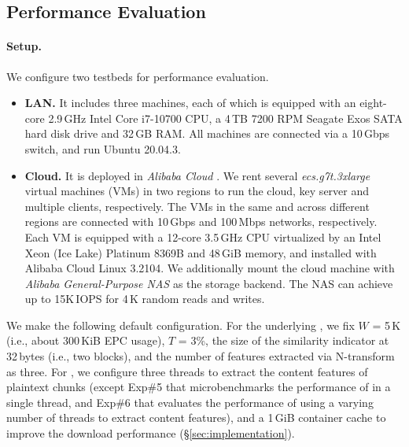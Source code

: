 \subsection{Performance Evaluation}
\label{sub:evaluation-performance}


\paragraph{Setup.} We configure two testbeds for performance evaluation. %
\begin{itemize}[leftmargin=*]
\item {\bf LAN.} It includes three machines, each of which is equipped with an eight-core 2.9\,GHz Intel Core i7-10700 CPU, a 4\,TB 7200 RPM Seagate Exos SATA hard disk drive and 32\,GB RAM.  All machines are connected via a 10\,Gbps switch, and run Ubuntu 20.04.3.

\item {\bf Cloud.} It is deployed in {\em Alibaba Cloud} \cite{alibaba}. We rent several {\em ecs.g7t.3xlarge} virtual machines (VMs) in two regions to run the cloud, key server and multiple clients, respectively. The VMs in the same and across different regions are connected with 10\,Gbps and 100\,Mbps networks, respectively.
  Each VM is equipped with a 12-core 3.5\,GHz CPU virtualized by an Intel Xeon (Ice Lake) Platinum 8369B and 48\,GiB memory, and installed with  Alibaba Cloud Linux 3.2104. We additionally mount the cloud machine with {\em Alibaba General-Purpose NAS} as the storage backend. The NAS can achieve up to 15K\,IOPS for 4\,K random reads and writes.
\end{itemize}

We make the following default configuration. For the underlying \sysnameF, we fix $W$ = 5\,K (i.e., about 300\,KiB EPC usage), $T$ = 3\%, the size of the similarity indicator at 32\,bytes (i.e., two blocks), and the number of features extracted via N-transform as three. For \prototype, we configure three threads to extract the content features of plaintext chunks (except Exp\#5 that microbenchmarks the performance of \prototype in a single thread, and Exp\#6 that evaluates the performance of \prototype using a varying number of threads to extract content features), and a 1\,GiB container cache to improve the download performance (\S\ref{sec:implementation}).

